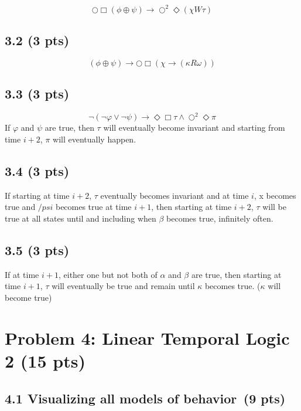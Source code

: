 \documentclass[12pt]{article}
\begin{document}
\begin{equation}
    \bigcirc \Box (\phi \oplus \psi) \rightarrow \bigcirc^2 \Diamond (\chi W \tau)
\end{equation}

\subsection*{3.2 (3 pts)}


\begin{equation}
    (\phi \oplus \psi) \rightarrow \bigcirc \Box (\chi \rightarrow (\kappa R \omega))
\end{equation}

\subsection*{3.3 (3 pts)}
\begin{equation}
    \neg (\neg \varphi \vee \neg \psi) \rightarrow \Diamond \Box \tau \land \bigcirc^2 \Diamond \pi
\end{equation}
If $\varphi$ and $\psi$ are true, then $\tau$ will eventually become invariant and starting from time $i+2$, $\pi$ will eventually happen.

\subsection*{3.4 (3 pts)}
If starting at time $i+2$, $\tau$ eventually becomes invariant and at time $i$, x becomes true and $/psi$ becomes true at time $i+1$, then starting at time $i+2$, $\tau$ will be true at all states until and including when $\beta$ becomes true, infinitely often. 

\subsection*{3.5 (3 pts)}
If at time $i+1$, either one but not both of $\alpha$ and $\beta$ are true, then starting at time $i+1$, $\tau$ will eventually be true and remain until $\kappa$ becomes true. ($\kappa$ will become true)

\newpage
\section{Problem 4: Linear Temporal Logic 2 (15 pts)}

\subsection*{4.1 Visualizing all models of behavior \,(9 pts)}
\end{document}
